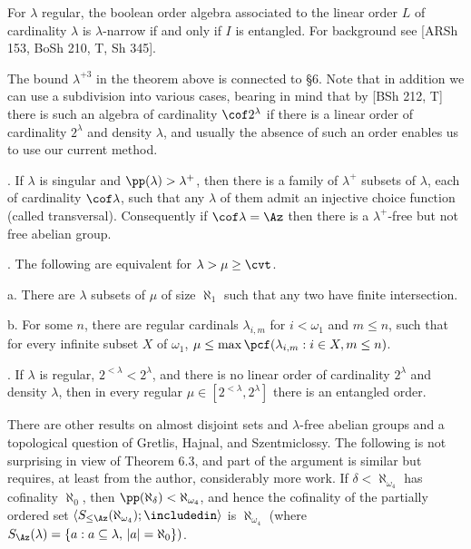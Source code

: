For $\lambda$ regular, the boolean order algebra 
associated to the
linear order $L$ of cardinality $\lambda$ is 
$\lambda$-narrow if and
only if $I$ is entangled. For background see [ARSh 153, 
BoSh 210, T, Sh
345].
 
The bound $\lambda^{+3}$ in the theorem above is connected 
to \S6. Note
that in addition we can use a subdivision into various 
cases, bearing
in mind that by [BSh 212, T] there is such an algebra of 
cardinality
$\cof 2^\lambda$ if there is a linear order of cardinality 
$2^\lambda$
and density $\lambda$, and usually the absence of such an 
order
enables us to use our current method.
 
. If $\lambda$ is singular and $\pp(\lambda)>\lambda^+
$, then there is a
family of $\lambda^+$ subsets of $\lambda$, each of 
cardinality $\cof
\lambda$, such that any $\lambda$ of them admit an 
injective choice
function \RM(called transversal\/\RM). Consequently if 
$\cof \lambda=\Az$ then there is a
$\lambda^+$-free but not free abelian group.

. The following are equivalent for $\lambda>\mu\ge 
\cvt$.

{\rm a.} There are $\lambda$ subsets of $\mu$ of size 
$\aleph_1$
such that any two have finite intersection.

{\rm b.} For some $n$, there are regular cardinals 
$\lambda_{i,m}$
for  $i<\omega_1$ and $m \le n$, such that for every 
infinite subset
$X$ of $\omega_1$, $\mu\le\max\pcf(\lambda_{i,m}:i\in X, 
m\le n)$.

. If $\lambda$ is regular,
$2^{<\lambda} < 2^\lambda$, and there is no linear order
of cardinality $2^\lambda$ and density $\lambda$,
then in every regular $\mu \in
[2 ^{<\lambda} , 2^\lambda]$
there is an entangled order.
\endproclaim
 
There are other results on almost disjoint sets and 
$\lambda$-free
abelian groups and a topological question of Gretlis, 
Hajnal, and
Szentmiclossy.
The following is  not surprising in view of
 Theorem 6.3, and part of the argument is similar
  but requires, at least from the author, considerably 
more work.
\endrem 
{} If $\delta<\aleph_{\omega_4}$ has 
cofinality
$\aleph_0$, then $\pp(\aleph_\delta)<\aleph_{\omega_4}$, 
and hence the
cofinality of the partially ordered set $\langle S_{\le
\Az}(\aleph_{\omega_4});\includedin\rangle$ is
$\aleph_{\omega_4}$ \RM(where $S_\Az(\lambda)=\{a:a\subseteq
\lambda,\,|a| =\aleph_0\})$. 
\endproclaim
 
